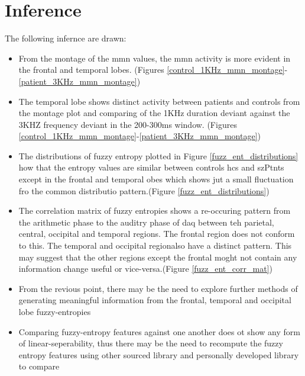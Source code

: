 \documentclass[10pt]{article}
\begin{document}
\section{Inference}
The following infernce are drawn:
\begin{itemize}
  \item From the montage of the \gls{mmn} values, the \gls{mmn} activity is more 
  evident in the frontal and temporal lobes. 
  (Figures \ref{control_1KHz_mmn_montage}-\ref{patient_3KHz_mmn_montage})
  \item The temporal lobe shows distinct activity between patients and controls 
  from the montage plot and comparing of the 1KHz duration deviant against the 3KHZ 
  frequency deviant in the 200-300ms window.
  (Figures \ref{control_1KHz_mmn_montage}-\ref{patient_3KHz_mmn_montage})
  \item The distributions of fuzzy entropy plotted in Figure \ref{fuzz_ent_distributions} 
  how that the entropy values are similar between controls \glspl{hc} and \glspl{szPtnt} 
  except in the frontal and temporal obes which shows jut a small fluctuation fro the 
  common distributio pattern.(Figure \ref{fuzz_ent_distributions})
  \item The correlation matrix of fuzzy entropies shows a re-occuring pattern from the 
  arithmetic phase to the auditry phase of \gls{daq} between teh parietal, central, 
  occipital and temporal regions. The frontal region does not conform to this. The 
  temporal and occipital regionalso have a distinct pattern. This 
  may suggest that the other regions except the frontal moght not contain any information 
  change useful or vice-versa.(Figure \ref{fuzz_ent_corr_mat})
  \item From the revious point, there may be the need to explore further methods of 
  generating meaningful information from the frontal, temporal and occipital lobe 
  fuzzy-entropies
  \item Comparing fuzzy-entropy features against one another does ot show any form of 
  linear-seperability, thus there may be the need to recompute the fuzzy entropy features 
  using other sourced library and personally developed library to compare
\end{itemize}
\end{document}
